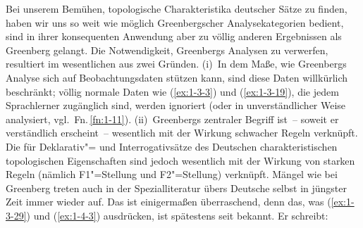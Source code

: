 \documentclass[output=paper]{langsci/langscibook}
\begin{document}
Bei unserem Bemühen, topologische Charakteristika deutscher Sätze zu finden, haben wir uns so weit wie möglich Greenbergscher Analysekategorien bedient, sind in
ihrer konsequenten Anwendung aber zu völlig anderen Ergebnissen als Greenberg
gelangt. Die Notwendigkeit, Greenbergs Analysen zu verwerfen, resultiert im wesentlichen aus zwei Gründen. (i)~In dem Maße, wie Greenbergs Analyse sich auf Beobachtungsdaten stützen kann, sind diese Daten willkürlich beschränkt; völlig normale Daten wie (\ref{ex:1-3-3}) und (\ref{ex:1-3-19}), die jedem Sprachlerner zugänglich sind, werden
ignoriert (oder in unverständlicher Weise analysiert, vgl.\ Fn.\,\ref{fn:1-11}). (ii)~Greenbergs zentraler Begriff  ist~-- soweit er verständlich erscheint~-- wesentlich mit der Wirkung schwacher Regeln verknüpft. Die für Deklarativ"= und
Interrogativsätze des Deutschen charakteristischen topologischen Eigenschaften sind
jedoch wesentlich mit der Wirkung von starken Regeln (nämlich F1"=Stellung und F2"=Stellung) verknüpft.
\ssubsection{}%
\label{subsec:1-5.1}
Mängel wie bei Greenberg treten auch in der Spezialliteratur übers Deutsche
selbst in jüngster Zeit immer wieder auf. Das ist einigermaßen überraschend, denn
das, was (\ref{ex:1-3-29}) und (\ref{ex:1-4-3}) ausdrücken, ist spätestens seit \citet{Erdmann1886} bekannt. Er
schreibt:
\end{document}
